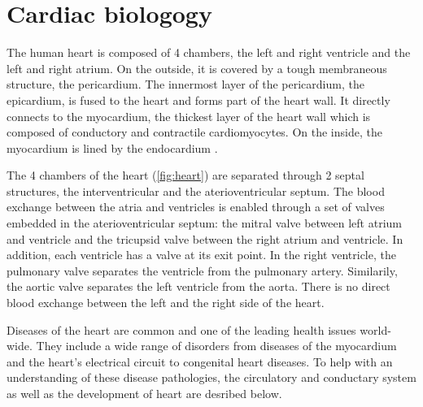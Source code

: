 \chapter{Cardiac biologogy}

The human heart is composed of \num{4} chambers, the left and right ventricle and the left and right atrium. On the outside, it is covered by a tough membraneous structure, the pericardium. The innermost layer of the  pericardium, the epicardium, is fused to the heart and forms part of the heart wall. It directly connects to the myocardium, the thickest layer of the heart wall which is composed of conductory and contractile cardiomyocytes. On the inside, the myocardium is lined by the endocardium \citep{Betts2013}.  

The \num{4} chambers of the heart (\cref{fig:heart}) are separated through \num{2} septal structures, the interventricular and the aterioventricular septum. The blood exchange between the atria and ventricles is enabled through a set of valves embedded in the aterioventricular septum: the mitral valve between left atrium and ventricle and the tricupsid valve between the right atrium and ventricle. In addition, each ventricle has a valve at its exit point. In the right ventricle, the pulmonary valve separates the ventricle from the pulmonary artery. Similarily, the aortic valve separates the left ventricle from the aorta. There is no direct blood exchange between the left and the right side of the heart. 

Diseases of the heart are common and one of the leading health issues world-wide. They include a wide range of disorders from diseases of the myocardium and the heart’s electrical circuit to congenital heart diseases. To help with an understanding of these disease pathologies, the circulatory and conductary system as well as the development of heart are desribed below. 

